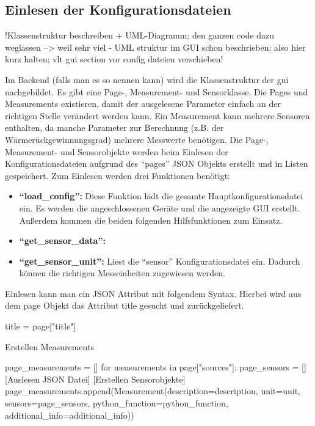 \subsection{Einlesen der Konfigurationsdateien}
!Klassenstruktur beschreiben + UML-Diagramm; den ganzen code dazu weglassen --> weil sehr viel - UML struktur im GUI schon beschrieben; also hier kurz halten; vlt gui section vor config dateien verschieben!

Im Backend (falls man es so nennen kann) wird die Klassenstruktur der \acs{gui} nachgebildet. Es gibt eine Page-, Measurement- und Sensorklasse. Die Pages und Measurements existieren, damit der ausgelesene Parameter einfach an der richtigen Stelle verändert werden kann. Ein Measurement kann mehrere Sensoren enthalten, da manche Parameter zur Berechnung  (z.B. der Wärmerückgewinnungsgrad) mehrere Messwerte benötigen. \newline 
Die Page-, Measurement- und Sensorobjekte werden beim Einlesen der Konfigurationsdateien aufgrund des \enquote{pages} JSON Objekts erstellt und in Listen gespeichert. \newline
Zum Einlesen werden drei Funktionen benötigt:
\begin{itemize}
	\item \textbf{\enquote{load\_config}:} Diese Funktion lädt die gesamte Hauptkonfigurationsdatei ein. Es werden die angeschlossenen Geräte und die angezeigte GUI erstellt. Außerdem kommen die beiden folgenden Hilfsfunktionen zum Einsatz.
	\item \textbf{\enquote{get\_sensor\_data}:} 
	\item \textbf{\enquote{get\_sensor\_unit}:} Liest die \enquote{sensor} Konfigurationsdatei ein. Dadurch können die richtigen Messeinheiten zugewiesen werden.
\end{itemize}

Einlesen kann man ein JSON Attribut mit folgendem Syntax. Hierbei wird aus dem page Objekt das Attribut title gesucht und zurückgeliefert.
\begin{pythoncode}
title = page["title"]
\end{pythoncode}

Erstellen Measurements
\begin{pythoncode}
page_measurements = []
for measurements in page["sources"]:
page_sensors = []
[Auslesen JSON Datei]
[Erstellen Sensorobjekte]
page_measurements.append(Measurement(description=description, unit=unit, sensors=page_sensors, python_function=python_function, additional_info=additional_info))
\end{pythoncode}

